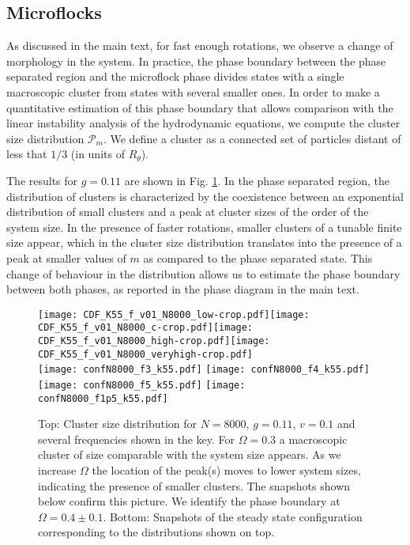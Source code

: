 \documentclass[aps,twocolumn,showlabels,showrefs,amsmath,amssymb,pre,superscriptaddress, floatfix, colors]{revtex4}
\newcommand{\1}{\begin{equation}}
\newcommand{\2}{\end{equation}}
\newcommand{\4}[2]{{\frac{#1}{#2}}}
\begin{document}
\subsection{Microflocks}

As discussed in the main text, for fast enough rotations, we observe a change of morphology in the system. In practice,  the phase boundary between the phase separated region and the microflock phase divides states with a single macroscopic cluster from states with several smaller ones. In order to make a quantitative estimation of this phase boundary that allows comparison with the linear instability analysis of the hydrodynamic equations, we compute the cluster size distribution $\mathcal{P}_m$. We define a cluster as a connected set of particles distant of less that $1/3$ (in units of $R_{\theta}$). 

The results for $g=0.11$ are shown in Fig. \ref{fig:CDF}. In the phase separated region, the distribution of clusters is characterized by the  coexistence between an exponential distribution of small clusters and a peak at cluster sizes of the order of the system size. In the presence of faster rotations, smaller clusters of a tunable finite size appear, which in the cluster size distribution translates into the presence of a peak at smaller values of $m$ as compared to the phase separated state. This change of behaviour in the distribution allows us to estimate the phase boundary between both phases, as reported in the phase diagram in the main text.      

\begin{figure}
\begin{center}
\texttt{[image: CDF\_K55\_f\_v01\_N8000\_low-crop.pdf]}\texttt{[image: CDF\_K55\_f\_v01\_N8000\_c-crop.pdf]}\texttt{[image: CDF\_K55\_f\_v01\_N8000\_high-crop.pdf]}\texttt{[image: CDF\_K55\_f\_v01\_N8000\_veryhigh-crop.pdf]}
\\
\hspace{1.1cm}\texttt{[image: confN8000\_f3\_k55.pdf]} \hspace{0.3cm}
\texttt{[image: confN8000\_f4\_k55.pdf]} \hspace{0.3cm}
\texttt{[image: confN8000\_f5\_k55.pdf]} \hspace{0.3cm}
\texttt{[image: confN8000\_f1p5\_k55.pdf]}

\end{center}
\caption{Top: Cluster size distribution for $N=8000$, $g=0.11$, $v=0.1$ and several frequencies shown in the key. 
For  $\Omega=0.3$ a macroscopic cluster of size comparable with the system size appears. As we increase $\Omega$ the location of the peak(s) moves to lower system sizes, indicating the presence of smaller clusters.  The snapshots shown below confirm this picture.  We identify the phase boundary at $\Omega=0.4\pm0.1$.
Bottom: Snapshots of the steady state configuration corresponding to the distributions shown on top.
} 
\label{fig:CDF}
\end{figure} 
\end{document}
